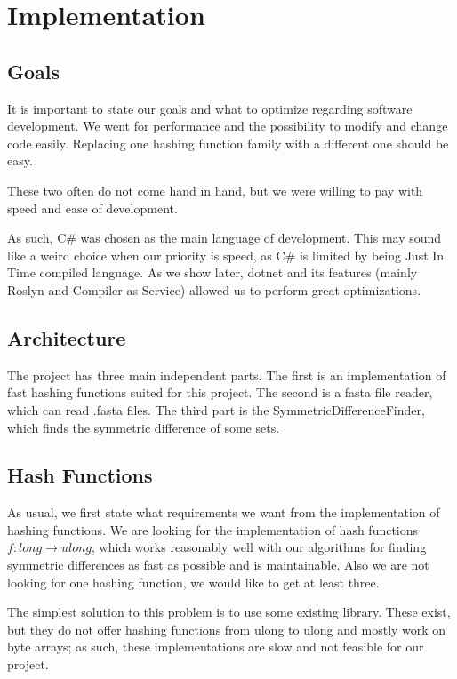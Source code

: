 \chapter{Implementation}

\section{Goals}
It is important to state our goals and what to optimize regarding software development. We went for performance and the possibility to modify and change code easily. Replacing one hashing function family with a different one should be easy.  

These two often do not come hand in hand, but we were willing to pay with speed and ease of development.

As such, C\# was chosen as the main language of development. This may sound like a weird choice when our priority is speed, as C\# is limited by being Just In Time compiled language. As we show later, dotnet and its features (mainly Roslyn and Compiler as Service) allowed us to perform great optimizations. 


\section{Architecture}
The project has three main independent parts. The first is an implementation of fast hashing functions suited for this project. The second is a fasta file reader, which can read .fasta files. The third part is the SymmetricDifferenceFinder, which finds the symmetric difference of some sets.


\section{}

\section{Hash Functions}

As usual, we first state what requirements we want from the implementation of hashing functions. We are looking for the implementation of hash functions $f: long \rightarrow ulong$, which works reasonably well with our algorithms for finding symmetric differences as fast as possible and is maintainable. Also we are not looking for one hashing function, we would like to get at least three.

The simplest solution to this problem is to use some existing library. These exist, but they do not offer hashing functions from ulong to ulong and mostly work on byte arrays; as such, these implementations are slow and not feasible for our project.

